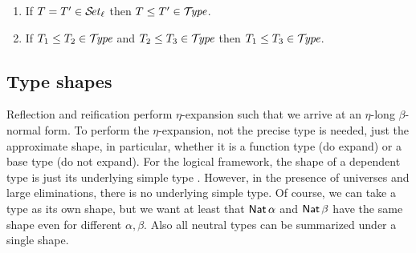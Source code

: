 \documentclass[acmlarge,review,anonymous]{acmart}\settopmatter{printfolios=true}
\begin{document}
\begin{lemma}
\label{lem:preord}
\bla
\begin{enumerate}
\item If\/ $T = T' \in \SET[\ell]$ then $T \leq T' \in \TYPE$.
\item If\/ $T_1 \leq T_2 \in \TYPE$ and $T_2 \leq T_3 \in \TYPE$ then $T_1 \leq T_3 \in \TYPE$.
\end{enumerate}
\end{lemma}





\subsection{Type shapes}
\label{sec:shape}

Reflection and reification perform $\eta$-expansion such that we arrive at an $\eta$-long $\beta$-normal form.  To perform the $\eta$-expansion, not the precise type is needed, just the approximate shape, in particular, whether it is a function type (do expand) or a base type (do not expand).
For the logical framework, the shape of a dependent type is just its
underlying simple type \cite{harperPfenning:equivalenceLF}. However,
in the presence of universes and large eliminations, there is no
underlying simple type.  Of course, we can take a type as its own
shape, but we want at least that $\Nat \alpha$ and $\Nat \beta$ have
the same shape even for different $\alpha, \beta$.
Also all neutral types can be summarized under a single shape.
\end{document}
